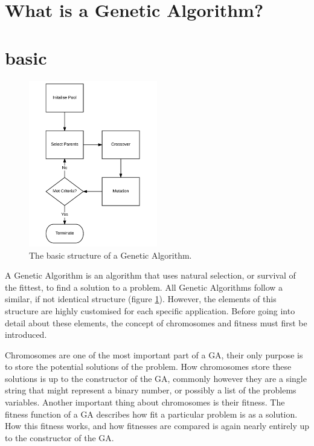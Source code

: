 \section{What is a Genetic Algorithm?}
\section{basic}
\par
\begin{figure}[h]
	\centering
		\includegraphics[width=0.5\textwidth]{GA_Structure}
	\caption{The basic structure of a Genetic Algorithm.}
	\label{struct}
\end{figure}
\noindent
A Genetic Algorithm is an algorithm that uses natural selection, or survival of the fittest, to find a solution to a problem. All Genetic Algorithms follow a similar, if not identical structure (figure \ref{struct}). However, the elements of this structure are highly customised for each specific application. Before going into detail about these elements, the concept of chromosomes and fitness must first be introduced.
\par
Chromosomes are one of the most important part of a GA, their only purpose is to store the potential solutions of the problem. How chromosomes store these solutions is up to the constructor of the GA, commonly however they are a single string that might represent a binary number, or possibly a list of the problems variables. Another important thing about chromosomes is their fitness. The fitness function of a GA describes how fit a particular problem is as a solution. How this fitness works, and how fitnesses are compared is again nearly entirely up to the constructor of the GA.


